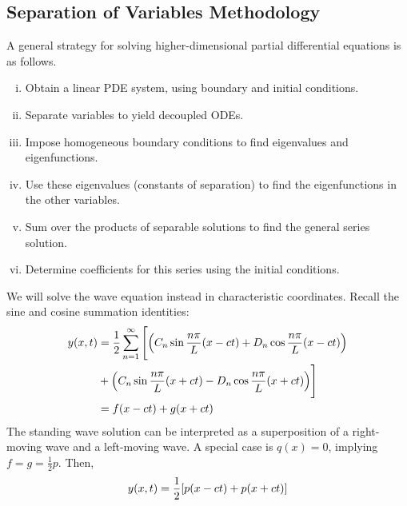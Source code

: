 \subsection{Separation of Variables Methodology}
A general strategy for solving higher-dimensional partial differential equations is as follows.
\begin{enumerate}[(i)]
	\item Obtain a linear PDE system, using boundary and initial conditions.
	\item Separate variables to yield decoupled ODEs.
	\item Impose homogeneous boundary conditions to find eigenvalues and eigenfunctions.
	\item Use these eigenvalues (constants of separation) to find the eigenfunctions in the other variables.
	\item Sum over the products of separable solutions to find the general series solution.
	\item Determine coefficients for this series using the initial conditions.
\end{enumerate}
\begin{example}
	We will solve the wave equation instead in characteristic coordinates.
	Recall the sine and cosine summation identities:
	\begin{align*}
		y(x,t) & = \frac{1}{2} \sum_{n=1}^\infty \Bigg[ \qty(C_n \sin \frac{n \pi}{L}(x-ct) + D_n \cos \frac{n \pi}{L}(x-ct)) \\&
		+ \qty(C_n \sin \frac{n \pi}{L}(x+ct) - D_n \cos \frac{n \pi}{L}(x+ct)) \Bigg]                                        \\
		       & = f(x-ct) + g(x+ct)
	\end{align*}
	The standing wave solution can be interpreted as a superposition of a right-moving wave and a left-moving wave.
	A special case is \( q(x) = 0 \), implying \( f = g = \frac{1}{2} p \).
	Then,
	\[
		y(x,t) = \frac{1}{2}\qty[p(x-ct) + p(x+ct)]
	\]
\end{example}

